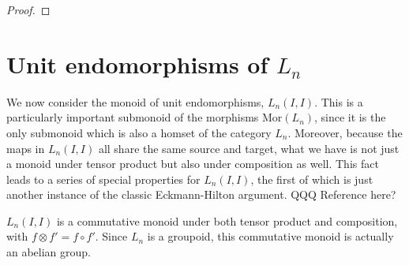 \documentclass{amsbook} %
\numberwithin{section}{chapter}
\begin{document}
\begin{proof}
\end{proof} 

\section{Unit endomorphisms of \texorpdfstring{$L_n$}{L_n}}

We now consider the monoid of unit endomorphisms, $L_n(I,I)$. This is a particularly important submonoid of the morphisms $\mathrm{Mor}(L_n)$, since it is the only submonoid which is also a homset of the category $L_n$. Moreover, because the maps in $L_n(I,I)$ all share the same source and target, what we have is not just a monoid under tensor product but also under composition as well. This fact leads to a series of special properties for $L_n(I,I)$, the first of which is just another instance of the classic Eckmann-Hilton argument. QQQ Reference here?

\begin{prop} \label{endcom} $L_n(I,I)$ is a commutative monoid under both tensor product and composition, with $f \otimes f' = f \circ f'$. Since $L_n$ is a groupoid, this commutative monoid is actually an abelian group.
\end{prop}
\end{document}
